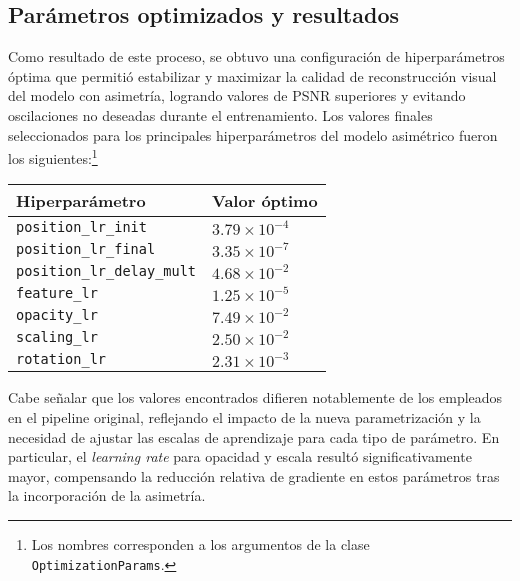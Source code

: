 \subsection{Parámetros optimizados y resultados}

Como resultado de este proceso, se obtuvo una configuración de hiperparámetros óptima que permitió estabilizar y maximizar la calidad de reconstrucción visual del modelo con asimetría, logrando valores de PSNR superiores y evitando oscilaciones no deseadas durante el entrenamiento. Los valores finales seleccionados para los principales hiperparámetros del modelo asimétrico fueron los siguientes:\footnote{Los nombres corresponden a los argumentos de la clase \texttt{OptimizationParams}.}

\begin{center}
\begin{tabular}{ll}
\toprule
\textbf{Hiperparámetro} & \textbf{Valor óptimo} \\
\midrule
\texttt{position\_lr\_init}           & $3.79 \times 10^{-4}$ \\
\texttt{position\_lr\_final}          & $3.35 \times 10^{-7}$ \\
\texttt{position\_lr\_delay\_mult}    & $4.68 \times 10^{-2}$ \\
\texttt{feature\_lr}                  & $1.25 \times 10^{-5}$ \\
\texttt{opacity\_lr}                  & $7.49 \times 10^{-2}$ \\
\texttt{scaling\_lr}                  & $2.50 \times 10^{-2}$ \\
\texttt{rotation\_lr}                 & $2.31 \times 10^{-3}$ \\
\bottomrule
\end{tabular}
\end{center}

\noindent
Cabe señalar que los valores encontrados difieren notablemente de los empleados en el pipeline original, reflejando el impacto de la nueva parametrización y la necesidad de ajustar las escalas de aprendizaje para cada tipo de parámetro. En particular, el \textit{learning rate} para opacidad y escala resultó significativamente mayor, compensando la reducción relativa de gradiente en estos parámetros tras la incorporación de la asimetría.

